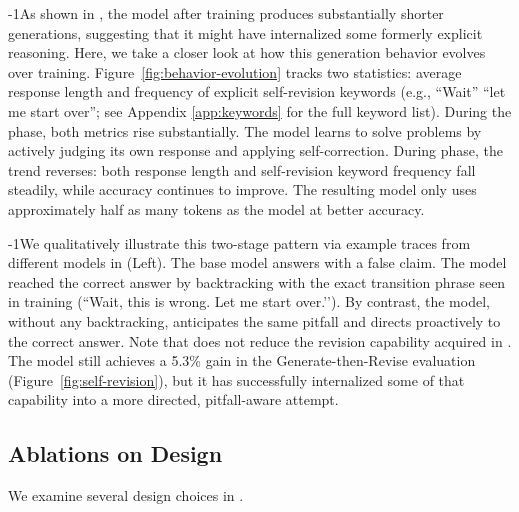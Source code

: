 \looseness-1As shown in , the \ours{} model after \opsd{} training produces substantially shorter generations, suggesting that it might have internalized some
formerly explicit reasoning. Here, we take a closer look at how this generation behavior evolves over \ours{} training.
Figure~\ref{fig:behavior-evolution}  tracks two statistics: average response length and frequency of explicit self-revision keywords (e.g., ``Wait'' ``let me start over''; see Appendix \ref{app:keywords} for the full keyword list). During the \sft{} phase, both metrics rise substantially. The model learns to solve problems by actively judging its own response and applying self-correction. During \opsd{} phase, the trend reverses: both response length and self-revision keyword frequency fall steadily, while accuracy continues to improve. The resulting model only uses approximately half as many tokens as the \sft{} model at better accuracy.

\looseness-1We qualitatively illustrate this two-stage pattern via example traces from different models in  (Left). The base model answers with a false claim. The \sft{} model reached the correct answer by backtracking with the exact transition phrase seen in training (``Wait, this is wrong. Let me start over.’’). By contrast, the \ours{} model, without any backtracking, anticipates the same pitfall and directs proactively to the correct answer.
Note that \opsd{} does not reduce the revision capability acquired in \sft{}. The model still achieves a 5.3\% gain in the Generate-then-Revise evaluation (Figure~\ref{fig:self-revision}), but it has successfully internalized some of that capability into a more directed, pitfall-aware attempt.

\subsection{Ablations on \ours{} Design}
\label{sec:ablations}

We examine several design choices in \ours{}.

